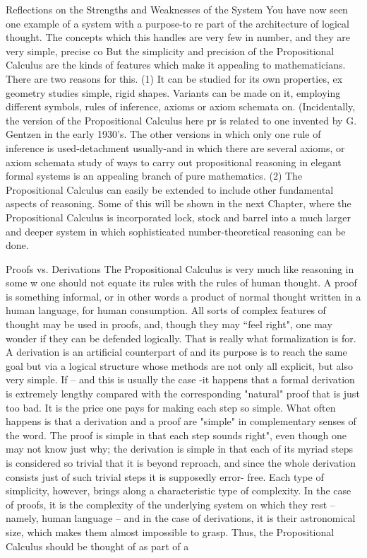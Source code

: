         Reflections on the Strengths and Weaknesses of the System
You have now seen one example of a system with a purpose-to re part of the architecture
of logical thought. The concepts which this handles are very few in number, and they are
very simple, precise co But the simplicity and precision of the Propositional Calculus are
the kinds of features which make it appealing to mathematicians. There are two reasons
for this. (1) It can be studied for its own properties, ex geometry studies simple, rigid
shapes. Variants can be made on it, employing different symbols, rules of inference,
axioms or axiom schemata on. (Incidentally, the version of the Propositional Calculus
here pr is related to one invented by G. Gentzen in the early 1930's. The other versions in
which only one rule of inference is used-detachment usually-and in which there are
several axioms, or axiom schemata study of ways to carry out propositional reasoning in
elegant formal systems is an appealing branch of pure mathematics. (2) The Propositional
Calculus can easily be extended to include other fundamental aspects of reasoning. Some
of this will be shown in the next Chapter, where the Propositional Calculus is
incorporated lock, stock and barrel into a much larger and deeper system in which
sophisticated number-theoretical reasoning can be done.

                                Proofs vs. Derivations
The Propositional Calculus is very much like reasoning in some w one should not equate
its rules with the rules of human thought. A proof is something informal, or in other
words a product of normal thought written in a human language, for human consumption.
All sorts of complex features of thought may be used in proofs, and, though they may
“feel right", one may wonder if they can be defended logically. That is really what
formalization is for. A derivation is an artificial counterpart of and its purpose is to reach
the same goal but via a logical structure whose methods are not only all explicit, but also
very simple.
        If -- and this is usually the case -it happens that a formal derivation is extremely
lengthy compared with the corresponding "natural" proof that is just too bad. It is the
price one pays for making each step so simple. What often happens is that a derivation
and a proof are "simple" in complementary senses of the word. The proof is simple in
that each step sounds right", even though one may not know just why; the derivation is
simple in that each of its myriad steps is considered so trivial that it is beyond reproach,
and since the whole derivation consists just of such trivial steps it is supposedly error-
free. Each type of simplicity, however, brings along a characteristic type of complexity.
In the case of proofs, it is the complexity of the underlying system on which they rest --
namely, human language -- and in the case of derivations, it is their astronomical size,
which makes them almost impossible to grasp.
        Thus, the Propositional Calculus should be thought of as part of a




